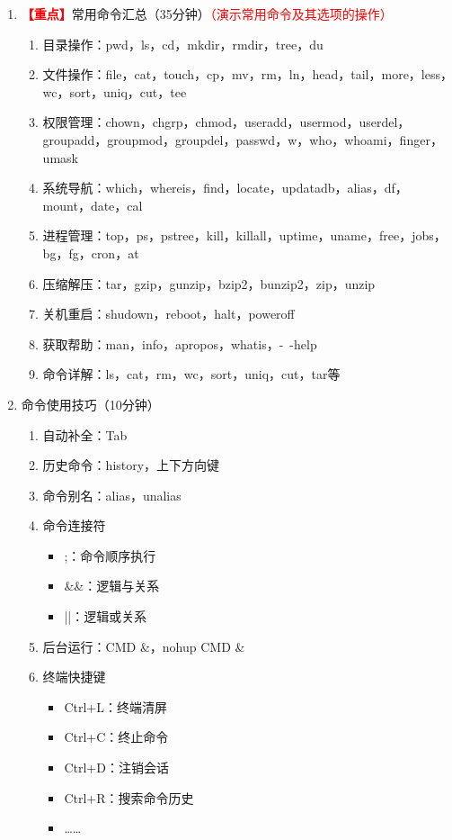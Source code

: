 \documentclass{TIJMUjiaoanLL}
\begin{document}
\begin{enumerate}
  \item \textcolor{red}{\textbf{【重点】}}常用命令汇总（35分钟）\textcolor{red}{（演示常用命令及其选项的操作）}
    \begin{enumerate}
      \item 目录操作：pwd，ls，cd，mkdir，rmdir，tree，du
      \item 文件操作：file，cat，touch，cp，mv，rm，ln，head，tail，more，less，wc，sort，uniq，cut，tee
      \item 权限管理：chown，chgrp，chmod，useradd，usermod，userdel，groupadd，groupmod，groupdel，passwd，w，who，whoami，finger，umask
      \item 系统导航：which，whereis，find，locate，updatadb，alias，df，mount，date，cal
      \item 进程管理：top，ps，pstree，kill，killall，uptime，uname，free，jobs，bg，fg，cron，at
      \item 压缩解压：tar，gzip，gunzip，bzip2，bunzip2，zip，unzip
      \item 关机重启：shudown，reboot，halt，poweroff
      \item 获取帮助：man，info，apropos，whatis，-\ -help
      \item 命令详解：ls，cat，rm，wc，sort，uniq，cut，tar等
    \end{enumerate}

  \item 命令使用技巧（10分钟）
    \vspace*{-10pt}
    \begin{multicols}{2}
    \begin{enumerate}
      \item 自动补全：Tab
      \item 历史命令：history，上下方向键
      \item 命令别名：alias，unalias
      \item 命令连接符
	\begin{itemize}
	  \item ;：命令顺序执行
	  \item \&\&：逻辑与关系
	  \item ||：逻辑或关系
	\end{itemize}
      \item 后台运行：CMD \&，nohup CMD \&
      \item 终端快捷键
	\begin{itemize}
	  \item Ctrl+L：终端清屏
	  \item Ctrl+C：终止命令
	  \item Ctrl+D：注销会话
	  \item Ctrl+R：搜索命令历史
	  \item ……
	\end{itemize}
    \end{enumerate}
    \end{multicols}
    \vspace*{-10pt}


\end{enumerate}
\end{document}
